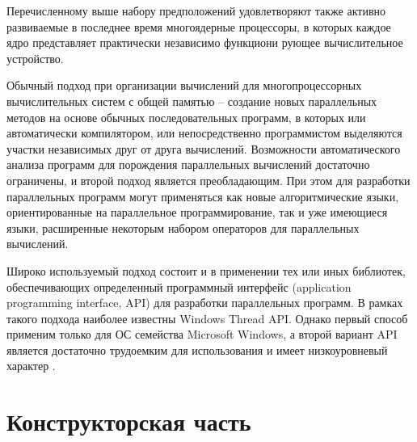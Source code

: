 \documentclass[12pt, a4paper]{report}
\begin{document}
	Перечисленному выше набору предположений удовлетворяют также активно развиваемые в последнее время многоядерные процессоры, в которых каждое ядро представляет практически независимо функциони рующее вычислительное устройство.
	
	Обычный подход при организации вычислений для многопроцессорных вычислительных систем с общей памятью – создание новых параллельных методов на основе обычных последовательных программ, в которых или автоматически компилятором, или непосредственно программистом выделяются участки независимых друг от друга вычислений. Возможности автоматического анализа программ для порождения параллельных вычислений достаточно ограничены, и второй подход является преобладающим. При этом для разработки параллельных программ могут применяться как новые алгоритмические языки, ориентированные на параллельное программирование, так и уже имеющиеся языки, расширенные некоторым набором операторов для параллельных вычислений.
	
	Широко используемый подход состоит и в применении тех или иных библиотек, обеспечивающих определенный программный интерфейс (application programming interface, API) для разработки параллельных программ. В рамках такого подхода наиболее известны Windows Thread API. Однако первый способ применим только для ОС семейства Microsoft Windows, а второй вариант API является достаточно трудоемким для использования и имеет низкоуровневый характер \cite{Barkalov}.
	
	\chapter{Конструкторская часть}
	
\end{document}
